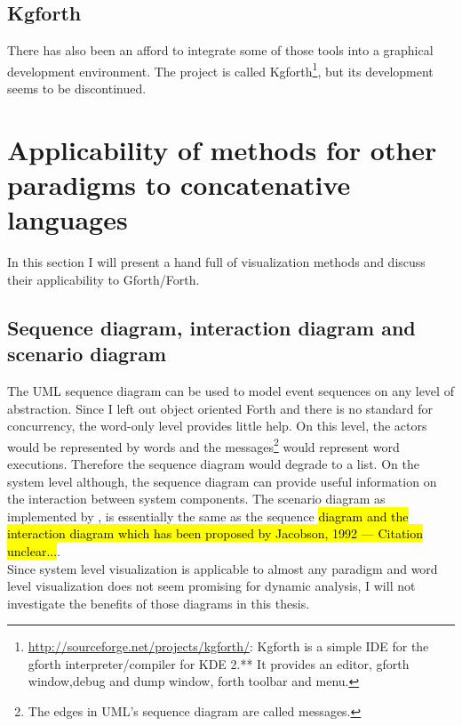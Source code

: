 \subsection*{Kgforth}

There has also been an afford to integrate some of those tools into a graphical development environment. The project is called Kgforth\footnote{\url{http://sourceforge.net/projects/kgforth/}: Kgforth is a simple IDE for the gforth interpreter/compiler for KDE 2.** 
It provides an editor, gforth window,debug and dump window, forth toolbar and menu.}, but its development seems to be discontinued.

\section{Applicability of methods for other paradigms to concatenative languages}

In this section I will present a hand full of visualization methods and discuss their applicability to Gforth/Forth. 

\subsection*{Sequence diagram, interaction diagram and scenario diagram}

The \gls{UML} sequence diagram can be used to model event sequences on any level of abstraction. Since I left out object oriented Forth and there is no standard for concurrency, the word-only level provides little help. On this level, the actors would be represented by words and the messages\footnote{The edges in UML's sequence diagram are called messages.} would represent word executions. Therefore the sequence diagram would degrade to a list. On the system level although, the sequence diagram can provide useful information on the interaction between system components. The scenario diagram as implemented by \cite{Koskimies:1996:SUS:871313}, is essentially the same as the sequence \hl{diagram and the interaction diagram which has been proposed by Jacobson, 1992 --- Citation unclear...}.
\\
Since system level visualization is applicable to almost any paradigm and word level visualization does not seem promising for dynamic analysis, I will not investigate the benefits of those diagrams in this thesis.

